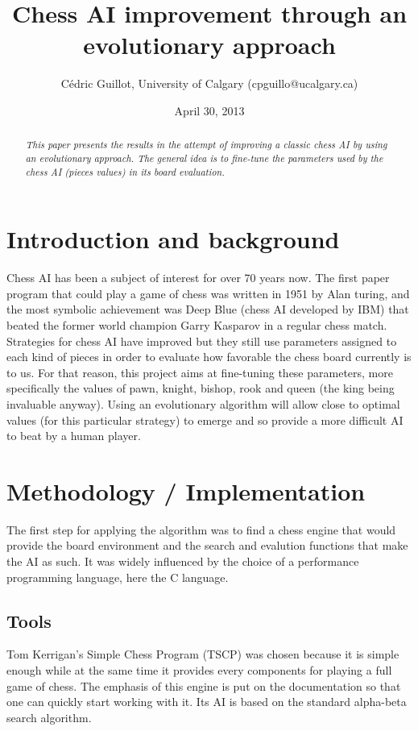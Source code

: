 \documentclass[12pt,a4paper,twocolumn]{article}
\title{Chess AI improvement through an evolutionary approach}
\author{Cédric Guillot, University of Calgary (cpguillo@ucalgary.ca)}
\date{April 30, 2013}
\begin{document}
\maketitle

\begin{abstract}
\textit{This paper presents the results in the attempt of improving a classic chess AI by using an evolutionary approach. The general idea is to fine-tune the parameters used by the chess AI (pieces values) in its board evaluation.}
\end{abstract}

\section{Introduction and background}
Chess AI has been a subject of interest for over 70 years now. The first paper program that could play a game of chess was written in 1951 by Alan turing, and the most symbolic achievement was Deep Blue (chess AI developed by IBM) that beated the former world champion Garry Kasparov in a regular chess match.\\
Strategies for chess AI have improved but they still use parameters assigned to each kind of pieces in order to evaluate how favorable the chess board currently is to us. For that reason, this project aims at fine-tuning these parameters, more specifically the values of pawn, knight, bishop, rook and queen (the king being invaluable anyway). Using an evolutionary algorithm will allow close to optimal values (for this particular strategy) to emerge and so provide a more difficult AI to beat by a human player.

\section{Methodology / Implementation}
The first step for applying the algorithm was to find a chess engine that would provide the board environment and the search and evalution functions that make the AI as such. It was widely influenced by the choice of a performance programming language, here the C language.

\subsection{Tools}
Tom Kerrigan’s Simple Chess Program (TSCP) was chosen because it is simple enough while at the same time it provides every components for playing a full game of chess. The emphasis of this engine is put on the documentation so that one can quickly start working with it. Its AI is based on the standard alpha-beta search algorithm.\\
\end{document}
